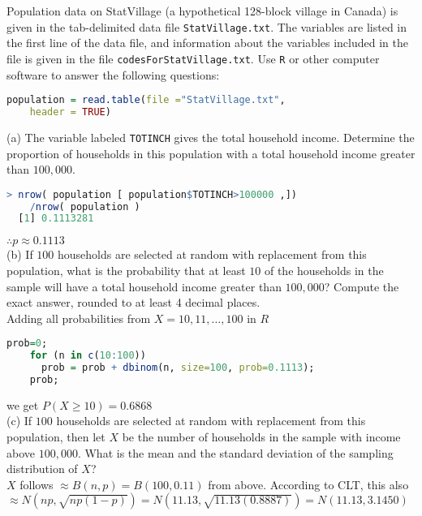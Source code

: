 \documentclass[boxes, qed]{homework}
\begin{document}
\begin{problem}Population data on StatVillage (a hypothetical 128-block village in Canada) is given in
  the tab-delimited data file \texttt{StatVillage.txt}. The variables are listed in the first line of the data file, and
  information about the variables included in the file is given in the file \texttt{codesForStatVillage.txt}. 
  Use \texttt{R} or other computer software to answer the following questions:
  \begin{lstlisting}[backgroundcolor = \color{lightgray},language = R]
  population = read.table(file ="StatVillage.txt", 
    header = TRUE)
  \end{lstlisting}
\end{problem}
\begin{solution}(a) The variable labeled \texttt{TOTINCH} gives the total household income. Determine the proportion of
  households in this population with a total household income greater than $100,000$.
  \begin{lstlisting}[backgroundcolor = \color{lightgray},language = R]
  > nrow( population [ population$TOTINCH>100000 ,])
    /nrow( population )
  [1] 0.1113281
  \end{lstlisting}
  $\therefore \boxed{p\approx{0.1113}}$\\

  (b) If $100$ households are selected at random with replacement from this population, what is the
  probability that at least $10$ of the households in the sample will have a total household income greater
  than $100,000$? Compute the exact answer, rounded to at least 4 decimal places.\\

  Adding all probabilities from $X=10, 11, \dots, 100$ in $R$
  \begin{lstlisting}[backgroundcolor = \color{lightgray},language = R]
    prob=0; 
    for (n in c(10:100)) 
      prob = prob + dbinom(n, size=100, prob=0.1113); 
    prob;
  \end{lstlisting}
  we get $\boxed{P(X\ge{10}) = 0.6868}$\\

  (c) If $100$ households are selected at random with replacement from this population, then let $X$ be
  the number of households in the sample with income above $100,000$. What is the mean and the standard
  deviation of the sampling distribution of $X$?\\

  $X$ follows $\approx B(n,p) = B(100,0.11)$ from above.
  According to CLT, this also $\approx N(np,\sqrt{np(1-p)}) 
    =N(11.13,\sqrt{11.13(0.8887)})
    =N(11.13,3.1450)$\\


\end{solution}
\end{document}
